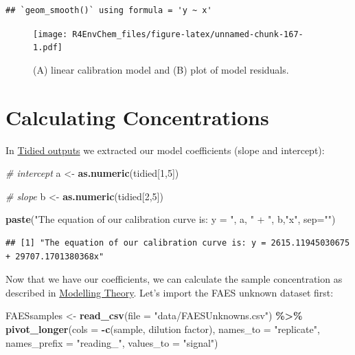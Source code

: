 \documentclass[
]{book}
\newenvironment{Shaded}{\begin{snugshade}}{\end{snugshade}}
\newcommand{\AttributeTok}[1]{\textcolor[rgb]{0.13,0.29,0.53}{#1}}
\newcommand{\CommentTok}[1]{\textcolor[rgb]{0.56,0.35,0.01}{\textit{#1}}}
\newcommand{\DecValTok}[1]{\textcolor[rgb]{0.00,0.00,0.81}{#1}}
\newcommand{\FunctionTok}[1]{\textcolor[rgb]{0.13,0.29,0.53}{\textbf{#1}}}
\newcommand{\NormalTok}[1]{#1}
\newcommand{\OtherTok}[1]{\textcolor[rgb]{0.56,0.35,0.01}{#1}}
\newcommand{\SpecialCharTok}[1]{\textcolor[rgb]{0.81,0.36,0.00}{\textbf{#1}}}
\newcommand{\StringTok}[1]{\textcolor[rgb]{0.31,0.60,0.02}{#1}}
\begin{document}
\begin{verbatim}
## `geom_smooth()` using formula = 'y ~ x'
\end{verbatim}

\begin{figure}
\centering
\texttt{[image: R4EnvChem\_files/figure-latex/unnamed-chunk-167-1.pdf]}
\caption{\label{fig:unnamed-chunk-167}(A) linear calibration model and (B) plot of model residuals.}
\end{figure}

\hypertarget{calculating-concentrations}{%
\section{Calculating Concentrations}\label{calculating-concentrations}}

In \protect\hyperlink{tidied-outputs}{Tidied outputs} we extracted our model coefficients (slope and intercept):

\begin{Shaded}
\begin{Highlighting}[]
\CommentTok{\# intercept}
\NormalTok{a }\OtherTok{\textless{}{-}} \FunctionTok{as.numeric}\NormalTok{(tidied[}\DecValTok{1}\NormalTok{,}\DecValTok{5}\NormalTok{])}

\CommentTok{\# slope}
\NormalTok{b }\OtherTok{\textless{}{-}} \FunctionTok{as.numeric}\NormalTok{(tidied[}\DecValTok{2}\NormalTok{,}\DecValTok{5}\NormalTok{])}

\FunctionTok{paste}\NormalTok{(}\StringTok{"The equation of our calibration curve is: y = "}\NormalTok{, a, }\StringTok{" + "}\NormalTok{, b,}\StringTok{"x"}\NormalTok{, }\AttributeTok{sep=}\StringTok{""}\NormalTok{)}
\end{Highlighting}
\end{Shaded}

\begin{verbatim}
## [1] "The equation of our calibration curve is: y = 2615.11945030675 + 29707.1701380368x"
\end{verbatim}

Now that we have our coefficients, we can calculate the sample concentration as described in \protect\hyperlink{modelling-theory}{Modelling Theory}. Let's import the FAES unknown dataset first:

\begin{Shaded}
\begin{Highlighting}[]
\NormalTok{FAESsamples }\OtherTok{\textless{}{-}} \FunctionTok{read\_csv}\NormalTok{(}\AttributeTok{file =} \StringTok{"data/FAESUnknowns.csv"}\NormalTok{) }\SpecialCharTok{\%\textgreater{}\%}
  \FunctionTok{pivot\_longer}\NormalTok{(}\AttributeTok{cols =} \SpecialCharTok{{-}}\FunctionTok{c}\NormalTok{(sample, }\StringTok{\textasciigrave{}}\AttributeTok{dilution factor}\StringTok{\textasciigrave{}}\NormalTok{), }
               \AttributeTok{names\_to =} \StringTok{"replicate"}\NormalTok{,}
               \AttributeTok{names\_prefix =} \StringTok{"reading\_"}\NormalTok{,}
               \AttributeTok{values\_to =} \StringTok{"signal"}\NormalTok{)}
\end{Highlighting}
\end{Shaded}
\end{document}
